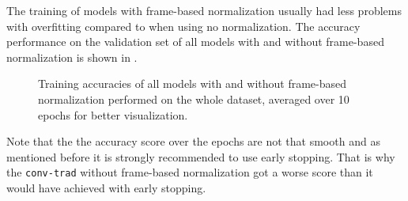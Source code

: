 \FloatBarrier
\noindent
The training of models with frame-based normalization usually had less problems with overfitting compared to when using no normalization.
The accuracy performance on the validation set of all models with and without frame-based normalization is shown in .
\begin{figure}[!ht]
  \centering
  \caption{Training accuracies of all models with and without frame-based normalization performed on the whole dataset, averaged over 10 epochs for better visualization.}
  \label{fig:exp_final_acc}
\end{figure}
\FloatBarrier
\noindent
Note that the the accuracy score over the epochs are not that smooth and as mentioned before it is strongly recommended to use early stopping.
That is why the \texttt{conv-trad} without frame-based normalization got a worse score than it would have achieved with early stopping.

